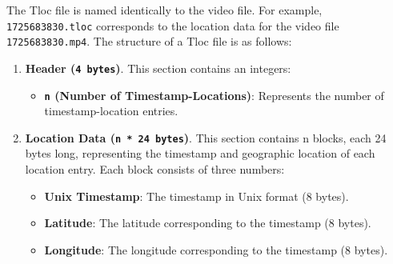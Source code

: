 The Tloc file is named identically to the video file. For example, \texttt{1725683830.tloc} corresponds to the location data for the video file \texttt{1725683830.mp4}. The structure of a Tloc file is as follows:
\begin{enumerate}
    \item\textbf{Header (\texttt{4 bytes})}. This section contains an integers:
    \begin{itemize}
        \item \textbf{\texttt{n} (Number of Timestamp-Locations)}: Represents the number of timestamp-location entries.
    \end{itemize}
    
    \item \textbf{Location Data (\texttt{n * 24 bytes})}. This section contains n blocks, each 24 bytes long, representing the timestamp and geographic location of each location entry. Each block consists of three numbers:
    \begin{itemize}
        \item \textbf{Unix Timestamp}: The timestamp in Unix format (8 bytes).
        \item \textbf{Latitude}: The latitude corresponding to the timestamp (8 bytes).
        \item \textbf{Longitude}: The longitude corresponding to the timestamp (8 bytes).
    \end{itemize}


\end{enumerate}
